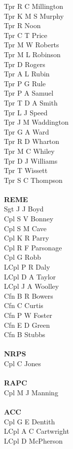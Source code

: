 \begin{multicols}{2}
  Tpr R C Millington \\
  Tpr K M S Murphy \\
  Tpr R Noon \\
  Tpr C T Price \\
  Tpr M W Roberts \\
  Tpr M L Robinson \\
  Tpr D Rogers \\
  Tpr A L Rubin \\
  Tpr P G Rule \\
  Tpr P A Samuel \\
  Tpr T D A Smith \\
  Tpr L J Speed \\
  Tpr J M Waddington \\
  Tpr G A Ward \\
  Tpr R D Wharton \\
  Tpr M C Whiley \\
  Tpr D J Williams \\
  Tpr T Wissett \\
  Tpr S C Thompson \\
  \\
  \textbf{REME} \\
  Sgt J J Boyd \\
  Cpl S V Bonney \\
  Cpl S M Cave \\
  Cpl K R Parry \\
  Cpl R F Parsonage \\
  Cpl G Robb \\
  LCpl P R Daly \\
  LCpl D A Taylor \\
  LCpl J A Woolley \\
  Cfn B R Bowers \\
  Cfn C Curtis \\
  Cfn P W Foster \\
  Cfn E D Green \\
  Cfn B Stubbs \\
  \\
  \textbf{NRPS} \\
  Cpl C Jones \\
  \\
  \textbf{RAPC} \\
  Cpl M J Manning \\
  \\
  \textbf{ACC} \\
  Cpl G E Dentith \\
  LCpl A C Cartwright \\
  LCpl D McPherson \\
\end{multicols}

